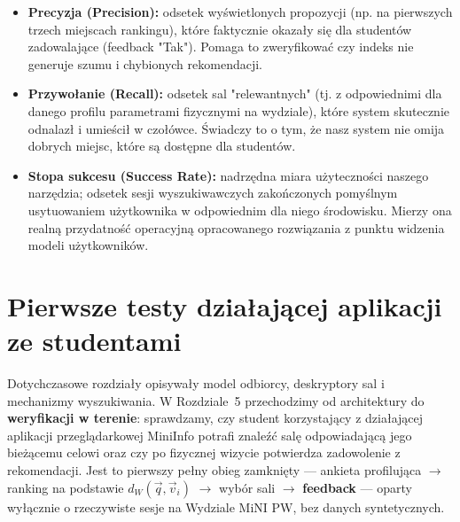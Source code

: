 \documentclass[14pt,a4paper]{extarticle}
\begin{document}
\begin{itemize}
    \item \textbf{Precyzja (Precision):} odsetek wyświetlonych propozycji (np. na pierwszych trzech miejscach rankingu), które faktycznie okazały się dla studentów zadowalające (feedback "Tak"). Pomaga to zweryfikować czy indeks nie generuje szumu i chybionych rekomendacji.
    \item \textbf{Przywołanie (Recall):} odsetek sal "relewantnych" (tj. z odpowiednimi dla danego profilu parametrami fizycznymi na wydziale), które system skutecznie odnalazł i umieścił w czołówce. Świadczy to o tym, że nasz system nie omija dobrych miejsc, które są dostępne dla studentów.
    \item \textbf{Stopa sukcesu (Success Rate):} nadrzędna miara użyteczności naszego narzędzia; odsetek sesji wyszukiwawczych zakończonych pomyślnym usytuowaniem użytkownika w odpowiednim dla niego środowisku. Mierzy ona realną przydatność operacyjną opracowanego rozwiązania z punktu widzenia modeli użytkowników.
\end{itemize}

\section{Pierwsze testy działającej aplikacji ze studentami}

Dotychczasowe rozdziały opisywały model odbiorcy, deskryptory sal i mechanizmy wyszukiwania. W Rozdziale~5 przechodzimy od architektury do \textbf{weryfikacji w terenie}: sprawdzamy, czy student korzystający z działającej aplikacji przeglądarkowej MiniInfo potrafi znaleźć salę odpowiadającą jego bieżącemu celowi oraz czy po fizycznej wizycie potwierdza zadowolenie z rekomendacji. Jest to pierwszy pełny obieg zamknięty --- ankieta profilująca $\rightarrow$ ranking na podstawie $d_W(\vec{q}, \vec{v}_i)$ $\rightarrow$ wybór sali $\rightarrow$ \textbf{feedback} --- oparty wyłącznie o rzeczywiste sesje na Wydziale MiNI PW, bez danych syntetycznych.
\end{document}
